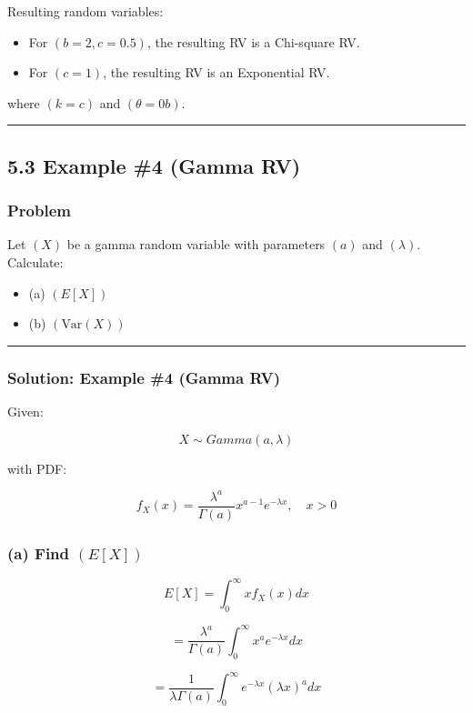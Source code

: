 \documentclass[12pt]{article}
\begin{document}
Resulting random variables:

\begin{itemize}
    \item For $(b=2, c=0.5)$, the resulting RV is a Chi-square RV.
    \item For $(c=1)$, the resulting RV is an Exponential RV.
\end{itemize}

where $(k=c)$ and $(\theta=0b)$.

\hrule
\vspace{1em}

\subsection*{\textbf{5.3 Example \#4 (Gamma RV)}}

\subsubsection*{\textbf{Problem}}

Let $(X)$ be a gamma random variable with parameters $(a)$ and $(\lambda)$. Calculate:

\begin{itemize}
    \item (a) $(E[X])$
    \item (b) $(\text{Var}(X))$
\end{itemize}

\hrule
\vspace{1em}

\subsubsection*{\textbf{Solution: Example \#4 (Gamma RV)}}

Given:

\[
X\sim Gamma(a,\lambda)
\]

with PDF:

\[
f_X(x)=\frac{\lambda^a}{\Gamma(a)}x^{a-1}e^{-\lambda x},\quad x>0
\]

\subsubsection*{\textbf{(a) Find $(E[X])$}}

\[
E[X]=\int_0^\infty xf_X(x)dx
\]

\[
=\frac{\lambda^a}{\Gamma(a)}\int_0^\infty x^a e^{-\lambda x}dx
\]

\[
=\frac{1}{\lambda\Gamma(a)}\int_0^\infty e^{-\lambda x}(\lambda x)^a dx
\]
\end{document}
